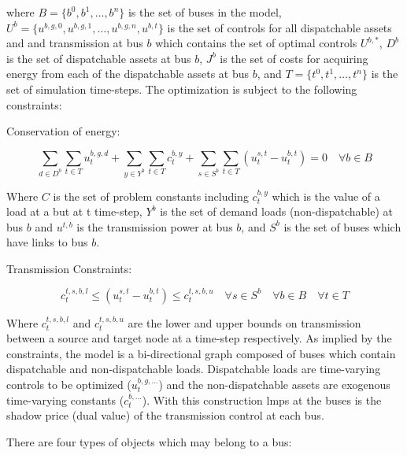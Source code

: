 \documentclass[12pt]{article}
\begin{document}
where $B=\{b^0, b^1, \dots, b^n\}$ is the set of buses in the model,  $U^b=\{u^{b,g,0}, u^{b,g,1}, \dots, u^{b,g,n}, u^{b,t}\}$ is the set of controls for all dispatchable assets and and transmission at bus $b$ which contains the set of optimal controls $U^{b,*}$, $D^b$ is the set of dispatchable assets at bus $b$, $J^b$ is the set of costs for acquiring energy from each of the dispatchable assets at bus $b$, and $T=\{t^0, t^1, \dots, t^n\}$ is the set of simulation time-steps. The optimization is subject to the following constraints:

Conservation of energy:

\begin{equation}
	\sum_{d\in D^b}\sum_{t\in T}u^{b,g,d}_t + \sum_{y\in Y^b}\sum_{t\in T}c^{b,y}_t + \sum_{s\in S^b}\sum_{t\in T} (u^{s,t}_t-u^{b,t}_t) = 0 \quad\forall b\in B
\end{equation}

Where $C$ is the set of problem constants including $c^{b,y}_t$ which is the value of a load at a but at t time-step, $Y^b$ is the set of demand loads (non-dispatchable) at bus $b$ and $u^{t,b}$ is the transmission power at bus $b$, and $S^b$ is the set of buses which have links to bus $b$.

Transmission Constraints:

\begin{equation}
	c^{t,s,b,l}_t \leq (u^{s,t}_t-u^{b,t}_t) \leq c^{t,s,b,u}_t \quad\forall s\in S^b\quad\forall b\in B\quad\forall t\in T
\end{equation}

Where $c^{t,s,b,l}_t$ and $c^{t,s,b,u}_t$ are the lower and upper bounds on transmission between a source and target node at a time-step respectively. As implied by the constraints, the model is a bi-directional graph composed of buses which contain dispatchable and non-dispatchable loads. Dispatchable loads are time-varying controls to be optimized ($u^{b,g,\dots}_t$) and the non-dispatchable assets are exogenous time-varying constants ($c^{b,\dots}_t$). With this construction \glspl{lmp} at the buses is the shadow price (dual value) of the transmission control at each bus.

There are four types of objects which may belong to a bus:
\end{document}
